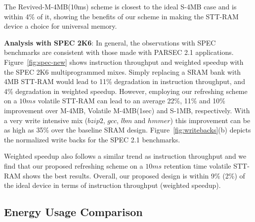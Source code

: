 The Revived-M-4MB(10ms) scheme is closest to the ideal S-4MB case and is within 4\% of it, showing the benefits of our scheme in making the STT-RAM device a choice for universal memory.

\begin{figure*} [t]
\centering
 \caption{\label{fig:spec-new} Normalized Average Instruction Throughput(IT) and Weighted Speedup(WS) for SPEC 2K6 multiprogrammed mixes. }
\end{figure*}

{\bf Analysis with SPEC 2K6}: In general, the observations with SPEC benchmarks are consistent with those made with PARSEC 2.1 applications. Figure~\ref{fig:spec-new} shows instruction throughput and weighted speedup with the  SPEC 2K6 multiprogrammed
mixes. Simply replacing a SRAM bank with 4MB STT-RAM would lead to 11\% degradation in instruction throughput, and 4\% degradation in weighted speedup. However, employing our refreshing scheme on a $10ms$ volatile STT-RAM can lead to an average 22\%, 11\%  and 10\% improvement over M-4MB, Volatile M-4MB(1sec) and S-1MB, respectively. With a very write intensive mix ($bzip2$, $gcc$, $lbm$ and $hmmer$) this improvement can be as high as 35\% over the baseline SRAM design. Figure~\ref{fig:writebacks}(b) depicts the normalized write backs for
the SPEC 2.1 benchmarks.


Weighted speedup also follows a similar trend as instruction throughput and we find that our proposed refreshing scheme on a $10ms$ retention time volatile STT-RAM shows the best results. Overall, our proposed design is within 9\% (2\%) of the ideal device in terms of instruction throughput (weighted speedup).

\subsection{Energy Usage Comparison}

